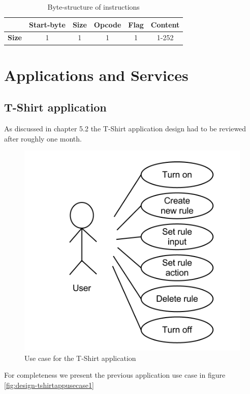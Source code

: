\begin{table}
\begin{tabular}{c|c|c|c|c|c|}
\cline{2-6}
& \textbf{Start-byte} & \textbf{Size} & \textbf{Opcode} & \textbf{Flag} & \textbf{Content} \\
\hline
\multicolumn{1}{|c|}{\textbf{Size}} & 1 & 1 & 1 & 1 & 1-252 \\
\hline
\end{tabular}
\caption{Byte-structure of instructions}
\label{tbl:instr_struct}
\end{table}

\newpage
\section{Applications and Services}

\subsection{T-Shirt application}

As discussed in chapter 5.2 the T-Shirt application design had to be reviewed after roughly one month.

\begin{figure}[h!]
\centering \includegraphics[scale=0.35]{img/design-tshirtappusecase2}
\caption{Use case for the T-Shirt application}
\label{fig:design-tshirtappusecase2}
\end{figure}

For completeness we present the previous application use case in figure \ref{fig:design-tshirtappusecase1}

